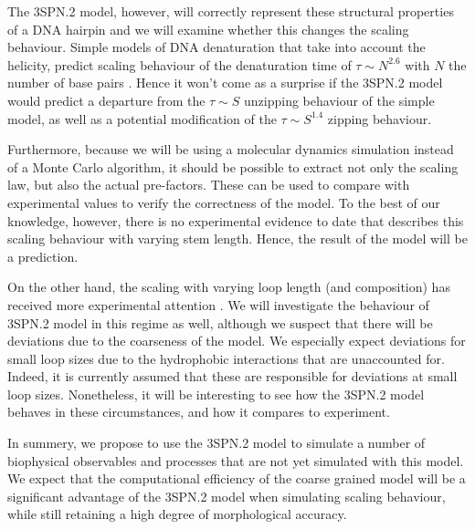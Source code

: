 The 3SPN.2 model, however, will correctly represent these structural properties of a DNA hairpin and we will examine whether this changes the scaling behaviour. Simple models of DNA denaturation that take into account the helicity, predict scaling behaviour of the denaturation time of $\tau \sim N^{2.6}$ with $N$ the number of base pairs \cite{carlon2010unwinding}. Hence it won't come as a surprise if the 3SPN.2 model would predict a departure from the $\tau \sim S$ unzipping behaviour of the simple model, as well as a potential modification of the $\tau \sim S^{1.4}$ zipping behaviour.

Furthermore, because we will be using a molecular dynamics simulation instead of a Monte Carlo algorithm, it should be possible to extract not only the scaling law, but also the actual pre-factors. These can be used to compare with experimental values to verify the correctness of the model. To the best of our knowledge, however, there is no experimental evidence to date that describes this scaling behaviour with varying stem length. Hence, the result of the model will be a prediction.

On the other hand, the scaling with varying loop length (and composition) has received more experimental attention \cite{bonnet1998kinetics}. We will investigate the behaviour of 3SPN.2 model in this regime as well, although we suspect that there will be deviations due to the coarseness of the model. We especially expect deviations for small loop sizes due to the hydrophobic interactions that are unaccounted for. Indeed, it is currently assumed \cite{vallone1999melting, shen2001loop} that these are responsible for deviations at small loop sizes. Nonetheless, it will be interesting to see how the 3SPN.2 model behaves in these circumstances, and how it compares to experiment.

In summery, we propose to use the 3SPN.2 model to simulate a number of biophysical observables and processes that are not yet simulated with this model. We expect that the computational efficiency of the coarse grained model will be a significant advantage of the 3SPN.2 model when simulating scaling behaviour, while still retaining a high degree of morphological accuracy.